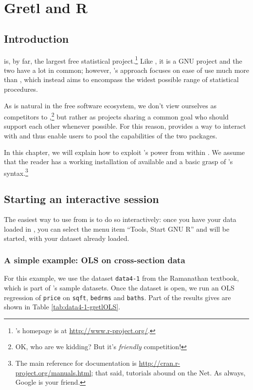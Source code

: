 \chapter{Gretl and R}
\label{gretlR}

\section{Introduction}
\label{R-intro}

 is, by far, the largest free statistical
project.\footnote{'s homepage is at
  \url{http://www.r-project.org/}.} Like , it is a GNU
project and the two have a lot in common; however, 's
approach focuses on ease of use much more than , which instead
aims to encompass the widest possible range of statistical procedures.

As is natural in the free software ecosystem, we don't view ourselves
as competitors to ,\footnote{OK, who are we kidding? But it's
  \emph{friendly} competition!} but rather as projects sharing a common
goal who should support each other whenever possible. For this reason,
 provides a way to interact with  and thus enable
users to pool the capabilities of the two packages.

In this chapter, we will explain how to exploit 's power from
within . We assume that the reader has a working
installation of  available and a basic grasp of 's
syntax.\footnote{The main reference for  documentation is
  \url{http://cran.r-project.org/manuals.html}; that said, 
  tutorials abound on the Net. As always, Google is your friend.}


\section{Starting an interactive  session}
\label{sec:R-interactive}

The easiest way to use  from  is to do so
interactively: once you have your data loaded in , you can
select the menu item ``Tools, Start GNU R'' and  will be
started, with your dataset already loaded.

\subsection{A simple example: OLS on cross-section data}
\label{sec:R-ols-ex}

For this example, we use the dataset \texttt{data4-1} from the
Ramanathan textbook, which is part of 's sample
datasets. Once the dataset is open, we run an OLS regression of
\texttt{price} on \texttt{sqft}, \texttt{bedrms} and
\texttt{baths}. Part of the results  gives are shown in Table
\ref{tab:data4-1-gretlOLS}.

